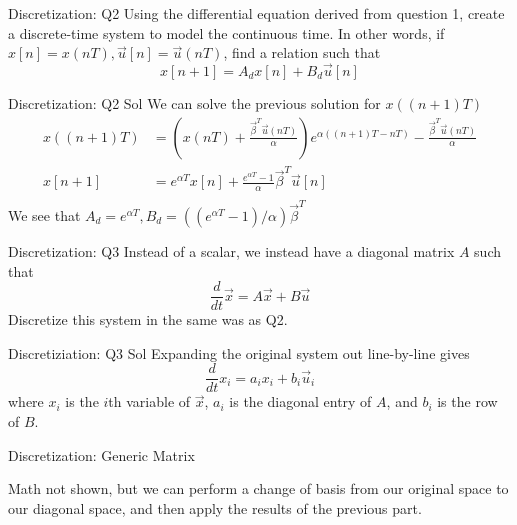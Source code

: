 \documentclass{beamer}
\begin{document}
    \begin{frame}{Discretization: Q2}
	Using the differential equation derived from question 1, create a discrete-time system to model the continuous time. In other words, if $x[n] = x(nT), \vec{u}[n] = \vec{u}(nT)$, find a relation such that
	\[ x[n + 1] = A_d x[n] + B_d \vec{u}[n] \]
	\end{frame}
    
    \begin{frame}{Discretization: Q2 Sol}
	We can solve the previous solution for $x((n + 1)T)$
	\begin{align*}
	x((n + 1)T) &= \left( x(nT) + \frac{\vec \beta^T \vec u(nT)}{\alpha} \right) e^{\alpha ((n + 1)T - nT)} - \frac{\vec \beta^T \vec u(nT)}{\alpha} \\
	x[n + 1] &= e^{\alpha T} x[n] + \frac{e^{\alpha T} - 1}{\alpha} \vec{\beta}^T \vec{u}[n] \\
	\end{align*}
	We see that $A_d = e^{\alpha T}, B_d = ((e^{\alpha T} - 1) / \alpha) \vec{\beta}^T$
	\end{frame}
    
    \begin{frame}{Discretization: Q3}
	Instead of a scalar, we instead have a diagonal matrix $A$ such that
	\[ \frac{d}{dt} \vec{x} = A \vec{x} + B \vec{u} \]
	Discretize this system in the same was as Q2.
	\end{frame}
    
    \begin{frame}{Discretiziation: Q3 Sol}
	Expanding the original system out line-by-line gives
	\[ \frac{d}{dt} x_i = a_i x_i + b_i \vec{u}_i \]
	where $x_i$ is the $i$th variable of $\vec{x}$, $a_i$ is the diagonal entry of $A$, and $b_i$ is the row of $B$.
	\end{frame}
	\begin{frame}{Discretization: Generic Matrix}
	
	Math not shown, but we can perform a change of basis from our original space to our diagonal space, and then apply the results of the previous part.
	
	\end{frame}
	
\end{document}
